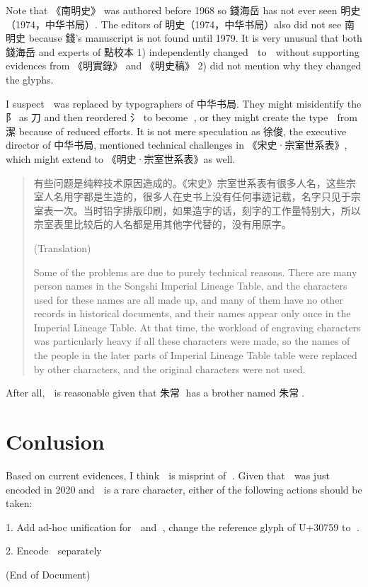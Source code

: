 \documentclass{article}
\begin{document}
Note that 《南明史》 was authored before 1968 so 錢海岳 has not ever seen 明史（1974，中华书局）. The editors of 明史（1974，中华书局）also did not see 南明史 because 錢's manuscript is not found until 1979\cite{南明史}. It is very unusual that both 錢海岳 and experts of 點校本 1) independently changed 﫠 to 𰝙 without supporting evidences from 《明實錄》 and 《明史稿》 2) did not mention why they changed the glyphs.

I suspect 﫠 was replaced by typographers of 中华书局. They might misidentify the 阝 as 刀 and then reordered 氵 to become 𰝙, or they might create the type 𰝙 from 潔 because of reduced efforts. It is not mere speculation as 徐俊, the executive director of 中华书局, mentioned \cite{徐俊谈点校本二十四史的修订} technical challenges in 《宋史·宗室世系表》, which might extend to 《明史·宗室世系表》as well.

\begin{quotation}
    有些问题是纯粹技术原因造成的。《宋史》宗室世系表有很多人名，这些宗室人名用字都是生造的，很多人在史书上没有任何事迹记载，名字只见于宗室表一次。当时铅字排版印刷，如果造字的话，刻字的工作量特别大，所以宗室表里比较后的人名都是用其他字代替的，没有用原字。

    (Translation)
    
    Some of the problems are due to purely technical reasons. There are many person names in the Songshi Imperial Lineage Table, and the characters used for these names are all made up, and many of them have no other records in historical documents, and their names appear only once in the Imperial Lineage Table. At that time, the workload of engraving characters was particularly heavy if all these characters were made, so the names of the people in the later parts of Imperial Lineage Table table were replaced by other characters, and the original characters were not used.
\end{quotation}

After all, 﫠 is reasonable given that 朱常﫠 has a brother named 朱常𰍠\cite{明史德王府世系表訂誤}.

\section{Conlusion}

Based on current evidences, I think 𰝙 is misprint of 﫠. Given that 𰝙 was just encoded in 2020 and 𰝙 is a rare character, either of the following actions should be taken:

1. Add ad-hoc unification for 﫠 and 𰝙, change the reference glyph of U+30759 to 﫠. 

2. Encode 﫠 separately

{}


\vfill
(End of Document)
\end{document}
